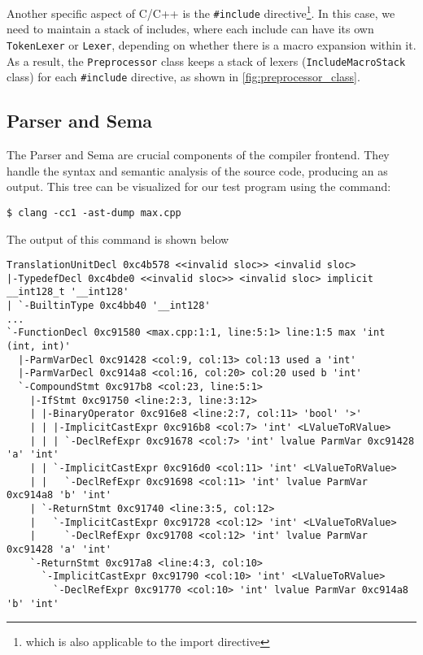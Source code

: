 Another specific aspect of C/C++ is the \texttt{#include}
directive\footnote{which is also applicable to the import directive}. In this
case, we need to maintain a stack of includes, where each include can have its
own \texttt{TokenLexer} or \texttt{Lexer}, depending on
whether there is a macro expansion within it. As a result, the
\texttt{Preprocessor} class keeps a stack of lexers
(\texttt{IncludeMacroStack} class) for each \texttt{#include}
directive, as shown in \cref{fig:preprocessor_class}. 

\subsection{Parser and Sema}
The Parser and Sema are crucial components of the \clang compiler frontend. They
handle the syntax and semantic analysis of the source code, producing an \myast
as output. This tree can be visualized for our test program using the command: 

\begin{adjustwidth}{0em}{0em}
\begin{verbatim}
$ clang -cc1 -ast-dump max.cpp
\end{verbatim}
\end{adjustwidth}

The output of this command is shown below
\begin{adjustwidth}{0em}{0em}
\begin{verbatim}
TranslationUnitDecl 0xc4b578 <<invalid sloc>> <invalid sloc>
|-TypedefDecl 0xc4bde0 <<invalid sloc>> <invalid sloc> implicit __int128_t '__int128'
| `-BuiltinType 0xc4bb40 '__int128'
...
`-FunctionDecl 0xc91580 <max.cpp:1:1, line:5:1> line:1:5 max 'int (int, int)'
  |-ParmVarDecl 0xc91428 <col:9, col:13> col:13 used a 'int'
  |-ParmVarDecl 0xc914a8 <col:16, col:20> col:20 used b 'int'
  `-CompoundStmt 0xc917b8 <col:23, line:5:1>
    |-IfStmt 0xc91750 <line:2:3, line:3:12>
    | |-BinaryOperator 0xc916e8 <line:2:7, col:11> 'bool' '>'
    | | |-ImplicitCastExpr 0xc916b8 <col:7> 'int' <LValueToRValue>
    | | | `-DeclRefExpr 0xc91678 <col:7> 'int' lvalue ParmVar 0xc91428 'a' 'int'
    | | `-ImplicitCastExpr 0xc916d0 <col:11> 'int' <LValueToRValue>
    | |   `-DeclRefExpr 0xc91698 <col:11> 'int' lvalue ParmVar 0xc914a8 'b' 'int'
    | `-ReturnStmt 0xc91740 <line:3:5, col:12>
    |   `-ImplicitCastExpr 0xc91728 <col:12> 'int' <LValueToRValue>
    |     `-DeclRefExpr 0xc91708 <col:12> 'int' lvalue ParmVar 0xc91428 'a' 'int'
    `-ReturnStmt 0xc917a8 <line:4:3, col:10>
      `-ImplicitCastExpr 0xc91790 <col:10> 'int' <LValueToRValue>
        `-DeclRefExpr 0xc91770 <col:10> 'int' lvalue ParmVar 0xc914a8 'b' 'int'
\end{verbatim}
\end{adjustwidth}

